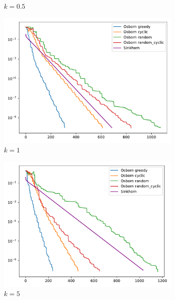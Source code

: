 \begin{figure}[H]
\begin{subfigure}[b]{.18\textwidth}
        \caption{\(k = 0.5\)}
    \end{subfigure}
    \hfill
    \begin{subfigure}[b]{.18\textwidth}
        \centering
        \includegraphics[width=\textwidth]{figures/dist2_k/osborn_vs_sinkhorn_dist2_0.01_1e-10_2_1}
        \caption{\(k = 1\)}
    \end{subfigure}
    \hfill
    \begin{subfigure}[b]{.18\textwidth}
        \centering
        \includegraphics[width=\textwidth]{figures/dist2_k/osborn_vs_sinkhorn_dist2_0.01_1e-10_2_5}
        \caption{\(k = 5\)}
    \end{subfigure}
    \hfill
    \begin{subfigure}[b]{.18\textwidth}

\end{subfigure}
\end{figure}
